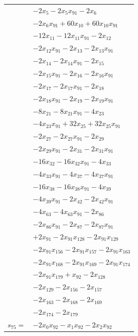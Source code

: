 \begin{longtable}{@{}r@{\;}l@{}}
 & \(\displaystyle -2x_{5} -2x_{5}x_{91} -2x_{6}\) \\
 & \(\displaystyle -2x_{6}x_{91} +60x_{10} +60x_{10}x_{91}\) \\
 & \(\displaystyle -12x_{11} -12x_{11}x_{91} -2x_{12}\) \\
 & \(\displaystyle -2x_{12}x_{91} -2x_{13} -2x_{13}x_{91}\) \\
 & \(\displaystyle -2x_{14} -2x_{14}x_{91} -2x_{15}\) \\
 & \(\displaystyle -2x_{15}x_{91} -2x_{16} -2x_{16}x_{91}\) \\
 & \(\displaystyle -2x_{17} -2x_{17}x_{91} -2x_{18}\) \\
 & \(\displaystyle -2x_{18}x_{91} -2x_{19} -2x_{19}x_{91}\) \\
 & \(\displaystyle -8x_{21} -8x_{21}x_{91} -4x_{23}\) \\
 & \(\displaystyle -4x_{23}x_{91} +32x_{25} +32x_{25}x_{91}\) \\
 & \(\displaystyle -2x_{27} -2x_{27}x_{91} -2x_{29}\) \\
 & \(\displaystyle -2x_{29}x_{91} -2x_{31} -2x_{31}x_{91}\) \\
 & \(\displaystyle -16x_{32} -16x_{32}x_{91} -4x_{33}\) \\
 & \(\displaystyle -4x_{33}x_{91} -4x_{37} -4x_{37}x_{91}\) \\
 & \(\displaystyle -16x_{38} -16x_{38}x_{91} -4x_{39}\) \\
 & \(\displaystyle -4x_{39}x_{91} -2x_{42} -2x_{42}x_{91}\) \\
 & \(\displaystyle -4x_{63} -4x_{63}x_{91} -2x_{86}\) \\
 & \(\displaystyle -2x_{86}x_{91} -2x_{87} -2x_{87}x_{91}\) \\
 & \(\displaystyle +2x_{91} -2x_{91}x_{128} -2x_{91}x_{129}\) \\
 & \(\displaystyle -2x_{91}x_{156} -2x_{91}x_{157} -2x_{91}x_{163}\) \\
 & \(\displaystyle -2x_{91}x_{168} -2x_{91}x_{169} -2x_{91}x_{174}\) \\
 & \(\displaystyle -2x_{91}x_{179} +x_{92} -2x_{128}\) \\
 & \(\displaystyle -2x_{129} -2x_{156} -2x_{157}\) \\
 & \(\displaystyle -2x_{163} -2x_{168} -2x_{169}\) \\
 & \(\displaystyle -2x_{174} -2x_{179}\) \\[3pt]
\(s_{75}=\) & \(\displaystyle -2x_{0}x_{92} -x_{1}x_{92} -2x_{2}x_{92}\) \\

\end{longtable}
